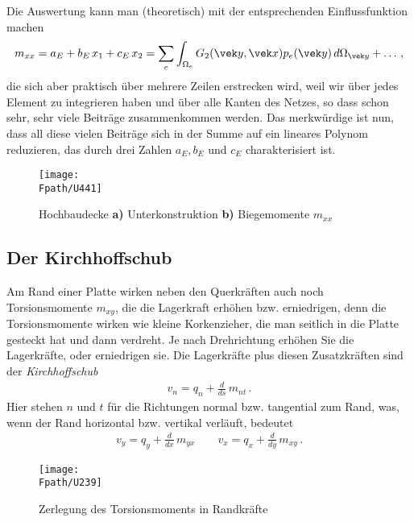 {Die Auswertung kann man (theoretisch) mit der entsprechenden Einflussfunktion machen
\begin{align}
m_{xx} = a_E + b_E\,x_1 + c_E\,x_2 = \sum_e \int_{\Omega_e} G_2(\vek y,\vek x) p_e(\vek y)\,d\Omega_{\vek y} + \ldots\,,
\end{align}
die sich aber praktisch \"{u}ber mehrere Zeilen erstrecken wird, weil wir \"{u}ber jedes Element zu integrieren haben und \"{u}ber alle Kanten des Netzes, so dass schon sehr, sehr viele Beitr\"{a}ge zusammenkommen werden. Das merkw\"{u}rdige ist nun, dass all diese vielen Beitr\"{a}ge sich in der Summe auf ein lineares Polynom reduzieren, das durch drei Zahlen $a_E, b_E $  und $c_E$ charakterisiert ist.

\begin{figure}[tbp]
\centering
\if {} \sidecaption[t] \fi
\texttt{[image: \\Fpath/U441]}
\caption{Hochbaudecke \textbf{ a)} Unterkonstruktion \textbf{ b)} Biegemomente $m_{xx}$} \label{U441}
\end{figure}%

{\textcolor{blau2}{\section{Der Kirchhoffschub}}
Am Rand einer Platte wirken neben den Querkr\"{a}ften auch noch Torsionsmomente $m_{xy}$, die die Lagerkraft erh\"{o}hen bzw. erniedrigen, denn die Torsionsmomente wirken wie kleine Korkenzieher, die man seitlich in die Platte gesteckt hat und dann verdreht. Je nach Drehrichtung erh\"{o}hen Sie die Lagerkr\"{a}fte, oder erniedrigen sie. Die Lagerkr\"{a}fte plus diesen Zusatzkr\"{a}ften sind der {\em Kirchhoffschub\/}
\begin{align}
v_n = q_n + \frac{d}{ds}\,m_{nt}\,.
\end{align}
Hier stehen $n$ und $t$ f\"{u}r die Richtungen normal bzw. tangential zum Rand, was, wenn der Rand horizontal bzw. vertikal verl\"{a}uft, bedeutet
\begin{align}
v_y = q_y + \frac{d}{dx}\,m_{yx} \qquad v_x = q_x + \frac{d}{dy}\,m_{xy}\,.
\end{align}

\begin{figure}[tbp]
\centering
\if {} \sidecaption \fi
\texttt{[image: \\Fpath/U239]}
\caption{ Zerlegung des Torsionsmoments in Randkr\"{a}fte} \label{U239}
\end{figure}%

}}
